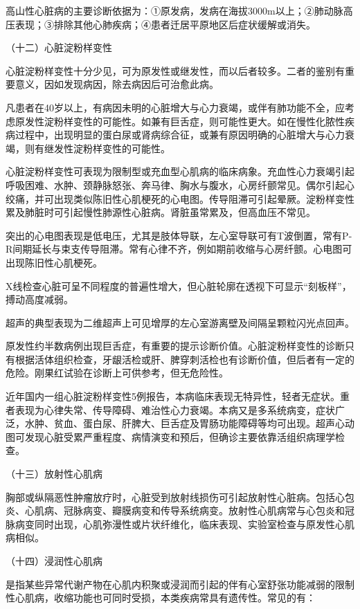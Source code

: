 高山性心脏病的主要诊断依据为：①原发病，发病在海拔3000m以上；②肺动脉高压表现；③排除其他心肺疾病；④患者迁居平原地区后症状缓解或消失。

\hypertarget{text00139.htmlux5cux23CHP16-3-3-2-12}{}
（十二）心脏淀粉样变性

心脏淀粉样变性十分少见，可为原发性或继发性，而以后者较多。二者的鉴别有重要意义，因如发现病因，除去病因后可治愈此病。

凡患者在40岁以上，有病因未明的心脏增大与心力衰竭，或伴有肺功能不全，应考虑原发性淀粉样变性的可能性。如兼有巨舌症，则可能性更大。如在慢性化脓性疾病过程中，出现明显的蛋白尿或肾病综合征，或兼有原因明确的心脏增大与心力衰竭，则有继发性淀粉样变性的可能性。

心脏淀粉样变性可表现为限制型或充血型心肌病的临床病象。充血性心力衰竭引起呼吸困难、水肿、颈静脉怒张、奔马律、胸水与腹水，心房纤颤常见。偶尔引起心绞痛，并可出现类似陈旧性心肌梗死的心电图。传导阻滞可引起晕厥。淀粉样变性累及肺脏时可引起慢性肺源性心脏病。肾脏虽常累及，但高血压不常见。

突出的心电图表现是低电压，尤其是肢体导联，左心室导联可有T波倒置，常有P-R间期延长与束支传导阻滞。常有心律不齐，例如期前收缩与心房纤颤。心电图可出现陈旧性心肌梗死。

X线检查心脏可呈不同程度的普遍性增大，但心脏轮廓在透视下可显示“刻板样”，搏动高度减弱。

超声的典型表现为二维超声上可见增厚的左心室游离壁及间隔呈颗粒闪光点回声。

原发性约半数病例出现巨舌症，有重要的提示诊断价值。心脏淀粉样变性的诊断只有根据活体组织检查，牙龈活检或肝、脾穿刺活检也有诊断价值，但后者有一定的危险。刚果红试验在诊断上可供参考，但无危险性。

近年国内一组心脏淀粉样变性5例报告，本病临床表现无特异性，轻者无症状。重者表现为心律失常、传导障碍、难治性心力衰竭。本病又是多系统病变，症状广泛，水肿、贫血、蛋白尿、肝脾大、巨舌症及胃肠功能障碍等均可出现。超声心动图可发现心脏受累严重程度、病情演变和预后，但确诊主要依靠活组织病理学检查。

\hypertarget{text00139.htmlux5cux23CHP16-3-3-2-13}{}
（十三）放射性心肌病

胸部或纵隔恶性肿瘤放疗时，心脏受到放射线损伤可引起放射性心脏病。包括心包炎、心肌病、冠脉病变、瓣膜病变和传导系统病变。放射性心肌病常与心包炎和冠脉病变同时出现，心肌弥漫性或片状纤维化，临床表现、实验室检查与原发性心肌病相似。

\hypertarget{text00139.htmlux5cux23CHP16-3-3-2-14}{}
（十四）浸润性心肌病

是指某些异常代谢产物在心肌内积聚或浸润而引起的伴有心室舒张功能减弱的限制性心肌病，收缩功能也可同时受损，本类疾病常具有遗传性。常见的有：

